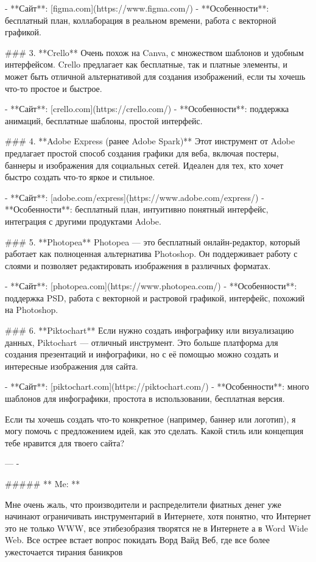 - **Сайт**: [figma.com](https://www.figma.com/)
- **Особенности**: бесплатный план, коллаборация в реальном времени, работа с векторной графикой.

### 3. **Crello**  
Очень похож на Canva, с множеством шаблонов и удобным интерфейсом. Crello предлагает как бесплатные, так и платные элементы, и может быть отличной альтернативой для создания изображений, если ты хочешь что-то простое и быстрое.

- **Сайт**: [crello.com](https://crello.com/)
- **Особенности**: поддержка анимаций, бесплатные шаблоны, простой интерфейс.

### 4. **Adobe Express (ранее Adobe Spark)**  
Этот инструмент от Adobe предлагает простой способ создания графики для веба, включая постеры, баннеры и изображения для социальных сетей. Идеален для тех, кто хочет быстро создать что-то яркое и стильное.

- **Сайт**: [adobe.com/express](https://www.adobe.com/express/)
- **Особенности**: бесплатный план, интуитивно понятный интерфейс, интеграция с другими продуктами Adobe.

### 5. **Photopea**  
Photopea — это бесплатный онлайн-редактор, который работает как полноценная альтернатива Photoshop. Он поддерживает работу с слоями и позволяет редактировать изображения в различных форматах.

- **Сайт**: [photopea.com](https://www.photopea.com/)
- **Особенности**: поддержка PSD, работа с векторной и растровой графикой, интерфейс, похожий на Photoshop.

### 6. **Piktochart**  
Если нужно создать инфографику или визуализацию данных, Piktochart — отличный инструмент. Это больше платформа для создания презентаций и инфографики, но с её помощью можно создать и интересные изображения для сайта.

- **Сайт**: [piktochart.com](https://piktochart.com/)
- **Особенности**: много шаблонов для инфографики, простота в использовании, бесплатная версия.

Если ты хочешь создать что-то конкретное (например, баннер или логотип), я могу помочь с предложением идей, как это сделать. Какой стиль или концепция тебе нравится для твоего сайта?

---
-  

##### ** Me: **



Мне очень жаль, что производители и распределители фиатных денег уже начинают ограничивать инструментарий в Интернете, хотя понятно, что Интернет это не только WWW, все этибезобразия творятся не в Интернете а в Word Wide Web. 
Все острее встает вопрос покидать Ворд Вайд Веб, где все более ужесточается тирания баникров


